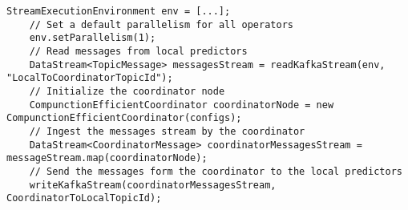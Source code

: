 \begin{lstlisting}[caption={The coordinator Flink program.},label={algonline:flink2},frame=single]
	StreamExecutionEnvironment env = [...];
	// Set a default parallelism for all operators 
	env.setParallelism(1);
	// Read messages from local predictors
	DataStream<TopicMessage> messagesStream = readKafkaStream(env, "LocalToCoordinatorTopicId");	
	// Initialize the coordinator node
	CompunctionEfficientCoordinator coordinatorNode = new CompunctionEfficientCoordinator(configs);
	// Ingest the messages stream by the coordinator	
	DataStream<CoordinatorMessage> coordinatorMessagesStream = messageStream.map(coordinatorNode);	
	// Send the messages form the coordinator to the local predictors
	writeKafkaStream(coordinatorMessagesStream, CoordinatorToLocalTopicId);
\end{lstlisting}

                 